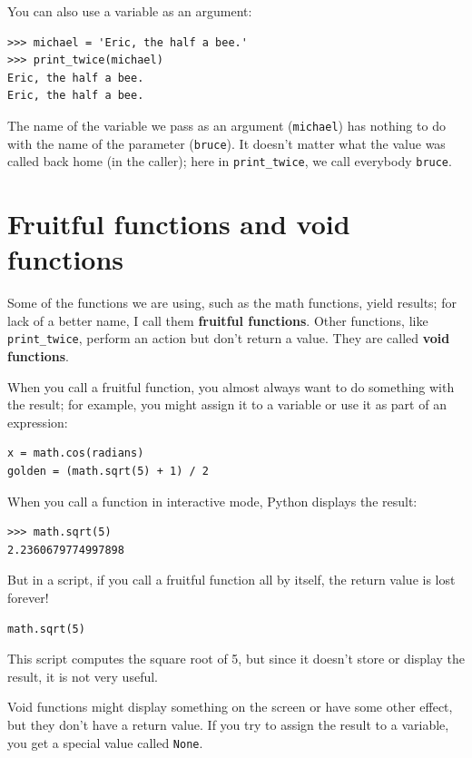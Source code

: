 \documentclass[10pt]{book}
\begin{document}
You can also use a variable as an argument:

\beforeverb
\begin{verbatim}
>>> michael = 'Eric, the half a bee.'
>>> print_twice(michael)
Eric, the half a bee.
Eric, the half a bee.
\end{verbatim}
\afterverb
%
The name of the variable we pass as an argument ({\tt michael}) has
nothing to do with the name of the parameter ({\tt bruce}).  It
doesn't matter what the value was called back home (in the caller);
here in \verb"print_twice", we call everybody {\tt bruce}.

\section{Fruitful functions and void functions}


Some of the functions we are using, such as the math functions, yield
results; for lack of a better name, I call them {\bf fruitful
  functions}.  Other functions, like \verb"print_twice", perform an
action but don't return a value.  They are called {\bf void
  functions}.

When you call a fruitful function, you almost always
want to do something with the result; for example, you might
assign it to a variable or use it as part of an expression:

\beforeverb
\begin{verbatim}
x = math.cos(radians)
golden = (math.sqrt(5) + 1) / 2
\end{verbatim}
\afterverb
%
When you call a function in interactive mode, Python displays
the result:

\beforeverb
\begin{verbatim}
>>> math.sqrt(5)
2.2360679774997898
\end{verbatim}
\afterverb
%
But in a script, if you call a fruitful function all by itself,
the return value is lost forever!

\beforeverb
\begin{verbatim}
math.sqrt(5)
\end{verbatim}
\afterverb
%
This script computes the square root of 5, but since it doesn't store
or display the result, it is not very useful.


Void functions might display something on the screen or have some
other effect, but they don't have a return value.  If you try to
assign the result to a variable, you get a special value called
{\tt None}.
\end{document}
